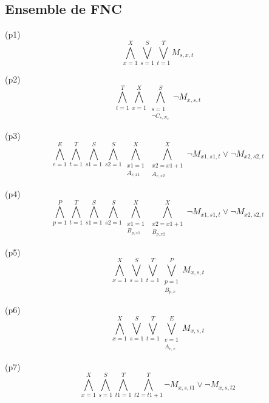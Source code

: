 \documentclass[a4paper,11pt]{article}
\begin{document}
\subsection{Ensemble de FNC}
(p1)
\begin{displaymath}
	\bigwedge\limits_{x=1}^{X}\bigvee\limits_{s=1}^{S}\bigvee\limits_{t=1}^{T} M_{s,x,t}
\end{displaymath}


(p2)
\begin{displaymath}
	\bigwedge\limits_{t=1}^{T}\bigwedge\limits_{x=1}^{X}\bigwedge\limits_{\substack{s=1 \\ \neg C_{s,N_{x}}}}^{S}  \neg M_{x,s,t}
\end{displaymath}

(p3)
\begin{displaymath}
\bigwedge\limits_{e=1}^{E}\bigwedge\limits_{t=1}^{T}\bigwedge\limits_{s1=1}^{S}\bigwedge\limits_{s2=1}^{S}\bigwedge\limits_{\substack{x1=1 \\ A_{e,x1}}}^{X}\bigwedge\limits_{\substack{x2=x1+1 \\ A_{e,x2}}}^{X} \neg M_{x1, s1, t} \vee \neg M_{x2, s2, t}
\end{displaymath}

(p4)
\begin{displaymath}
\bigwedge\limits_{p=1}^{P}\bigwedge\limits_{t=1}^{T}\bigwedge\limits_{s1=1}^{S}\bigwedge\limits_{s2=1}^{S}\bigwedge\limits_{\substack{x1=1 \\ B_{p,x1}}}^{X}\bigwedge\limits_{\substack{x2=x1+1 \\ B_{p,x2}}}^{X} \neg M_{x1, s1, t} \vee \neg M_{x2, s2, t}
\end{displaymath}

(p5)
\begin{displaymath}
\bigwedge\limits_{x=1}^{X}\bigvee\limits_{s=1}^{S}\bigvee\limits_{t=1}^{T}\bigvee\limits_{\substack{p=1 \\ B_{p,x}}}^{P} M_{x, s, t}
\end{displaymath}

(p6)
\begin{displaymath}
\bigwedge\limits_{x=1}^{X}\bigvee\limits_{s=1}^{S}\bigvee\limits_{t=1}^{T}\bigvee\limits_{\substack{e=1 \\ A_{e,x}}}^{E} M_{x, s, t}
\end{displaymath}

(p7)
\begin{displaymath}
\bigwedge\limits_{x=1}^{X}\bigwedge\limits_{s=1}^{S}\bigwedge\limits_{t1=1}^{T}\bigwedge\limits_{t2=t1+1}^{T} \neg M_{x, s, t1} \vee \neg M_{x, s, t2}
\end{displaymath}
\end{document}
